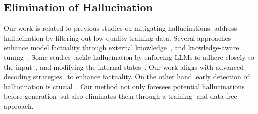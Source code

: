 \subsection{Elimination of Hallucination}
Our work is related to previous studies on mitigating hallucinations. \citet{shen2021identifying} address hallucination by filtering out low-quality training data. Several approaches enhance model factuality through 
external knowledge~\cite{wu2023ragtruth, xie2023adaptive, lyu2023improving, asai2023selfrag}, and knowledge-aware tuning~\cite{li2022large}.
Some studies tackle hallucination by enforcing LLMs to adhere closely to the input~\cite{tian2019sticking, aralikatte-etal-2021-focus}, and modifying the internal states~\cite{chen2023purr, azaria2023internal, gottesman2024estimating}. Our work aligns with advanced decoding strategies~\cite{wan-etal-2023-faithfulness, cheng2024integrative, shi2023trusting} to enhance factuality. 
On the other hand, early detection of hallucination is crucial~\cite{zhang2023language}. Our method not only foresees potential hallucinations before generation but also eliminates them through a training- and data-free approach.
